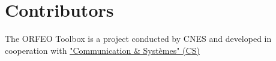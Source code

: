 \chapter*{Contributors}
\noindent

The ORFEO Toolbox is a project conducted by CNES and developed in
cooperation with \href{http://www.c-s.fr}{"Communication \& Syst\`{e}mes" (CS)}


